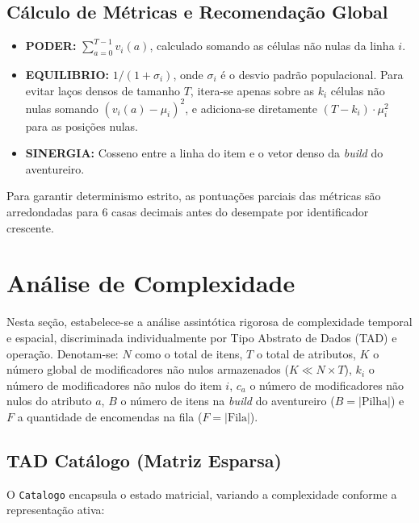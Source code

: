 \documentclass[letterpaper]{article}
\begin{document}
\subsection{Cálculo de Métricas e Recomendação Global}
\begin{itemize}
    \item \textbf{PODER:} $\sum_{a=0}^{T-1} v_i(a)$, calculado somando as células não nulas da linha $i$.
    \item \textbf{EQUILIBRIO:} $1 / (1 + \sigma_i)$, onde $\sigma_i$ é o desvio padrão populacional. Para evitar laços densos de tamanho $T$, itera-se apenas sobre as $k_i$ células não nulas somando $(v_i(a) - \mu_i)^2$, e adiciona-se diretamente $(T - k_i) \cdot \mu_i^2$ para as posições nulas.
    \item \textbf{SINERGIA:} Cosseno entre a linha do item e o vetor denso da \textit{build} do aventureiro.
\end{itemize}
Para garantir determinismo estrito, as pontuações parciais das métricas são arredondadas para 6 casas decimais antes do desempate por identificador crescente.

\section{Análise de Complexidade}
Nesta seção, estabelece-se a análise assintótica rigorosa de complexidade temporal e espacial, discriminada individualmente por Tipo Abstrato de Dados (TAD) e operação. Denotam-se: $N$ como o total de itens, $T$ o total de atributos, $K$ o número global de modificadores não nulos armazenados ($K \ll N \times T$), $k_i$ o número de modificadores não nulos do item $i$, $c_a$ o número de modificadores não nulos do atributo $a$, $B$ o número de itens na \textit{build} do aventureiro ($B = |\text{Pilha}|$) e $F$ a quantidade de encomendas na fila ($F = |\text{Fila}|$).

\subsection{TAD Catálogo (Matriz Esparsa)}
O \texttt{Catalogo} encapsula o estado matricial, variando a complexidade conforme a representação ativa:
\end{document}
